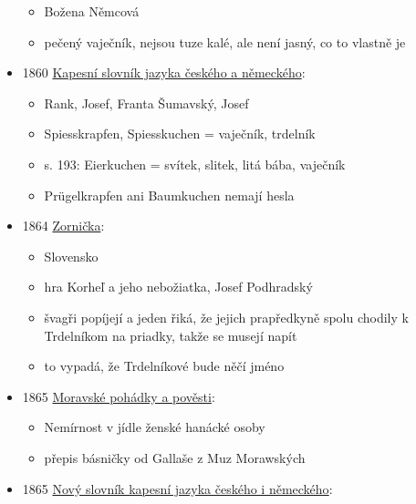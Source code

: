 \begin{itemize}
  \begin{itemize}
  \tightlist
  \item
    Božena Němcová
  \item
    pečený vaječník, nejsou tuze kalé, ale není jasný, co to vlastně je
  \end{itemize}
\item
  1860
  \href{https://ceskadigitalniknihovna.cz/uuid/uuid:f5239995-7f7b-4b26-8ceb-d90eebcd974c}{Kapesní
  slovník jazyka českého a německého}:

  \begin{itemize}
  \tightlist
  \item
    Rank, Josef, Franta Šumavský, Josef
  \item
    Spiesskrapfen, Spiesskuchen = vaječník, trdelník
  \item
    s. 193: Eierkuchen = svítek, slitek, litá bába, vaječník
  \item
    Prügelkrapfen ani Baumkuchen nemají hesla
  \end{itemize}
\item
  1864
  \href{https://dikda.snk.sk/uuid/uuid:43f40487-25fd-438a-b8b6-e0c25985b2c7}{Zornička}:

  \begin{itemize}
  \tightlist
  \item
    Slovensko
  \item
    hra Korheľ a jeho nebožiatka, Josef Podhradský
  \item
    švagři popíjejí a jeden řiká, že jejich prapředkyně spolu chodily k
    Trdelníkom na priadky, takže se musejí napít
  \item
    to vypadá, že Trdelníkové bude něčí jméno
  \end{itemize}
\item
  1865
  \href{https://www.google.cz/books/edition/Moravske_pohadkya_povesti_M\%C3\%A4hrische_M\%C3\%A4/42qLW6-LrScC?hl=cs&gbpv=1&pg=PA139&printsec=frontcover}{Moravské
  pohádky a pověsti}:

  \begin{itemize}
  \tightlist
  \item
    Nemírnost v jídle ženské hanácké osoby
  \item
    přepis básničky od Gallaše z Muz Morawských
  \end{itemize}
\item
  1865
  \href{https://ceskadigitalniknihovna.cz/uuid/uuid:a738d13c-8062-4352-9707-b5ae338b4873}{Nový
  slovník kapesní jazyka českého i německého}:


\end{itemize}
